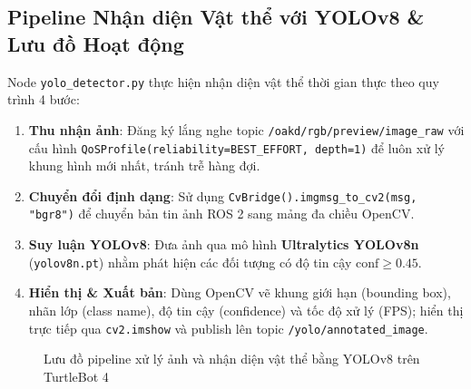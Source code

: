 \documentclass[12pt, a4paper]{article}
\begin{document}
\subsection{Pipeline Nhận diện Vật thể với YOLOv8 \& Lưu đồ Hoạt động}
Node \texttt{yolo\_detector.py} thực hiện nhận diện vật thể thời gian thực theo quy trình 4 bước:
\begin{enumerate}
    \item \textbf{Thu nhận ảnh}: Đăng ký lắng nghe topic \texttt{/oakd/rgb/preview/image\_raw} với cấu hình \texttt{QoSProfile(reliability=BEST\_EFFORT, depth=1)} để luôn xử lý khung hình mới nhất, tránh trễ hàng đợi.
    \item \textbf{Chuyển đổi định dạng}: Sử dụng \texttt{CvBridge().imgmsg\_to\_cv2(msg, "bgr8")} để chuyển bản tin ảnh ROS 2 sang mảng đa chiều OpenCV.
    \item \textbf{Suy luận YOLOv8}: Đưa ảnh qua mô hình \textbf{Ultralytics YOLOv8n} (\texttt{yolov8n.pt}) nhằm phát hiện các đối tượng có độ tin cậy $\text{conf} \ge 0.45$.
    \item \textbf{Hiển thị \& Xuất bản}: Dùng OpenCV vẽ khung giới hạn (bounding box), nhãn lớp (class name), độ tin cậy (confidence) và tốc độ xử lý (FPS); hiển thị trực tiếp qua \texttt{cv2.imshow} và publish lên topic \texttt{/yolo/annotated\_image}.
\end{enumerate}

\begin{figure}[H]
\centering
{}
\caption{Lưu đồ pipeline xử lý ảnh và nhận diện vật thể bằng YOLOv8 trên TurtleBot 4}
\label{fig:yolo_flowchart}
\end{figure}
\end{document}
